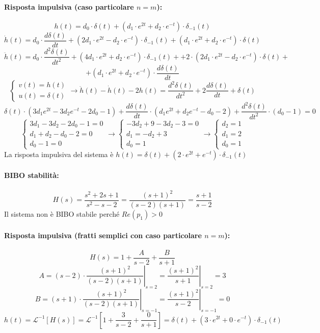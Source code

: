\documentclass[a4paper,oneside,titlepage]{book}
\begin{document}
\paragraph{Risposta impulsiva (caso particolare $n=m$):}
\[ h(t) = d_0 \cdot \delta(t) + (d_1 \cdot e^{2t} + d_2 \cdot e^{-t}) \cdot \delta_{-1}(t) \]
\[
\dot{h}(t) = d_0 \cdot \frac{d \delta(t)}{dt} + (2d_1 \cdot e^{2t} - d_2 \cdot e^{-t}) \cdot \delta_{-1}(t) + (d_1 \cdot e^{2t} + d_2 \cdot e^{-t}) \cdot \delta(t)
\]
\[ \ddot{h}(t) = d_0 \cdot \frac{d^2 \delta(t)}{dt^2}
+ (4d_1 \cdot e^{2t} + d_2 \cdot e^{-t}) \cdot \delta_{-1}(t) +
+ 2 \cdot (2d_1 \cdot e^{2t} - d_2 \cdot e^{-t}) \cdot \delta(t) + \]
\[ + (d_1 \cdot e^{2t} + d_2 \cdot e^{-t}) \cdot \frac{d \delta(t)}{dt} \]
\[
\begin{cases}
v(t) = h(t) \\
u(t) = \delta(t)
\end{cases}
\longrightarrow
\ddot{h}(t) - \dot{h}(t) -2 h(t) = \frac{d^2 \delta(t)}{dt^2} + 2 \frac{d \delta(t)}{dt} + \delta(t)
\]
\[
\delta(t) \cdot (3d_1 e^{2t} - 3d_2 e^{-t} - 2d_0 - 1)
+ \frac{d \delta(t)}{dt} \cdot (d_1 e^{2t} + d_2 e^{-t} - d_0 - 2)
+ \frac{d^2 \delta(t)}{dt^2} \cdot (d_0 - 1) = 0
\]
\[
\begin{cases}
3d_1 - 3d_2 - 2d_0 - 1 = 0 \\
d_1 + d_2 - d_0 - 2 = 0 \\
d_0 - 1 = 0
\end{cases}
\longrightarrow
\begin{cases}
-3d_2 + 9 - 3d_2 - 3 = 0 \\
d_1 = -d_2 + 3 \\
d_0 = 1
\end{cases}
\longrightarrow
\begin{cases}
d_2 = 1 \\
d_1 = 2 \\
d_0 = 1
\end{cases}
\]
La risposta impulsiva del sistema è $h(t) = \delta(t) + (2 \cdot e^{2t} + e^{-t}) \cdot \delta_{-1}(t)$

\paragraph{BIBO stabilità:}
\[ H(s) = \frac{s^2 + 2s + 1}{s^2 - s - 2} = \frac{(s + 1)^2}{(s - 2)(s + 1)} = \frac{s+1}{s-2} \]
Il sistema non è BIBO stabile perché $Re(p_1)>0$

\paragraph{Risposta impulsiva (fratti semplici con caso particolare $n=m$):}
\[ H(s) = 1 + \frac{A}{s - 2} + \frac{B}{s + 1} \]
\[ A = \left. (s-2) \cdot \frac{(s + 1)^2}{(s - 2)(s + 1)} \right|_{s=2} = \left. \frac{(s + 1)^2}{s + 1} \right|_{s=2} = 3 \]
\[ B = \left. (s+1) \cdot \frac{(s + 1)^2}{(s - 2)(s + 1)} \right|_{s=-1} = \left. \frac{(s + 1)^2}{s - 2} \right|_{s=-1} = 0 \]
\[
h(t) = \mathcal{L}^{-1} [H(s)] = \mathcal{L}^{-1} \left[ 1 + \frac{3}{s - 2} + \frac{0}{s + 1} \right]
= \delta(t) + \left( 3 \cdot e^{2t} + 0 \cdot e^{-t} \right) \cdot \delta_{-1}(t)
\]
\end{document}
